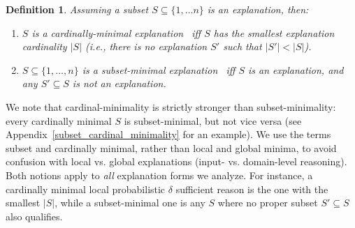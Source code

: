 \documentclass{article}
\newtheorem{definition}{Definition}
\begin{document}
\begin{definition}
Assuming a subset $S\subseteq \{1,\ldots n\}$ is an explanation, then:
    \begin{enumerate}
        \item $S$ is a \emph{cardinally-minimal} explanation~\citep{BaMoPeSu20, bassanlocal} iff $S$ has the smallest explanation cardinality $|S|$ (i.e., there is no explanation $S'$ such that $|S'|<|S|$).
        \item $S\subseteq \{1,\ldots, n\}$ is a \emph{subset-minimal} explanation~\citep{arenas2022computing, ignatiev2019abduction} iff $S$ is an explanation, and any $S'\subseteq S$ is not an explanation.
    \end{enumerate}
\end{definition}



We note that cardinal-minimality is strictly stronger than subset-minimality: every cardinally minimal $S$ is subset-minimal, but not vice versa (see Appendix~\ref{subset_cardinal_minimality} for an example). We use the terms subset and cardinally minimal, rather than local and global minima, to avoid confusion with local vs. global explanations (input- vs. domain-level reasoning). Both notions apply to \emph{all} explanation forms we analyze. For instance, a cardinally minimal local probabilistic $\delta$ sufficient reason is the one with the smallest $|S|$, while a subset-minimal one is any $S$ where no proper subset $S'\subseteq S$ also qualifies. 

\end{document}
